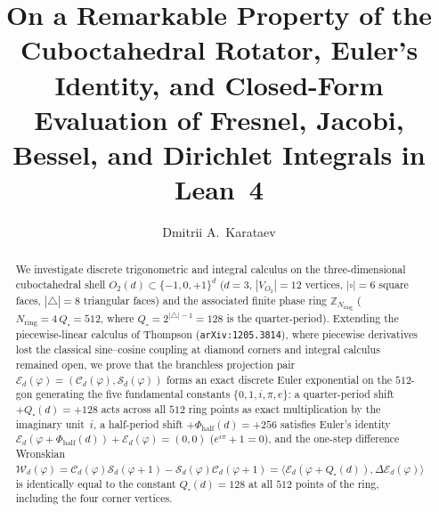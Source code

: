 \documentclass[11pt,a4paper]{article}
\title{\textbf{On a Remarkable Property of the Cuboctahedral Rotator, Euler's Identity, and Closed-Form Evaluation of Fresnel, Jacobi, Bessel, and Dirichlet Integrals in Lean~4}}
\author{Dmitrii A.~Karataev}
\date{}
\theoremstyle{plain}
\theoremstyle{definition}
\begin{document}
\maketitle

\begin{abstract}
We investigate discrete trigonometric and integral calculus on the three-dimensional cuboctahedral shell $O_2(d)\subset\{-1,0,+1\}^d$ ($d=3$, $|V_{O_2}|=12$ vertices, $|\square|=6$ square faces, $|\triangle|=8$ triangular faces) and the associated finite phase ring $\mathbb{Z}_{N_{\mathrm{ring}}}$ ($N_{\mathrm{ring}} = 4\,Q_\square = 512$, where $Q_\square = 2^{|\triangle|-1} = 128$ is the quarter-period). Extending the piecewise-linear calculus of Thompson (\texttt{arXiv:1205.3814}), where piecewise derivatives lost the classical sine--cosine coupling at diamond corners and integral calculus remained open, we prove that the branchless projection pair $\mathcal{E}_d(\varphi) = (\mathcal{C}_d(\varphi),\mathcal{S}_d(\varphi))$ forms an exact discrete Euler exponential on the $512$-gon generating the five fundamental constants $\{0,1,i,\pi,e\}$: a quarter-period shift $+Q_\square(d)=+128$ acts across all $512$ ring points as exact multiplication by the imaginary unit~$i$, a half-period shift $+\Phi_{\mathrm{half}}(d)=+256$ satisfies Euler's identity $\mathcal{E}_d(\varphi+\Phi_{\mathrm{half}}(d))+\mathcal{E}_d(\varphi)=(0,0)$ ($e^{i\pi}+1=0$), and the one-step difference Wronskian $\mathcal{W}_d(\varphi)=\mathcal{C}_d(\varphi)\mathcal{S}_d(\varphi+1)-\mathcal{S}_d(\varphi)\mathcal{C}_d(\varphi+1)=\langle \mathcal{E}_d(\varphi+Q_\square(d)),\Delta\mathcal{E}_d(\varphi)\rangle$ is identically equal to the constant $Q_\square(d)=128$ at all $512$ points of the ring, including the four corner vertices.


\end{abstract}
\end{document}

